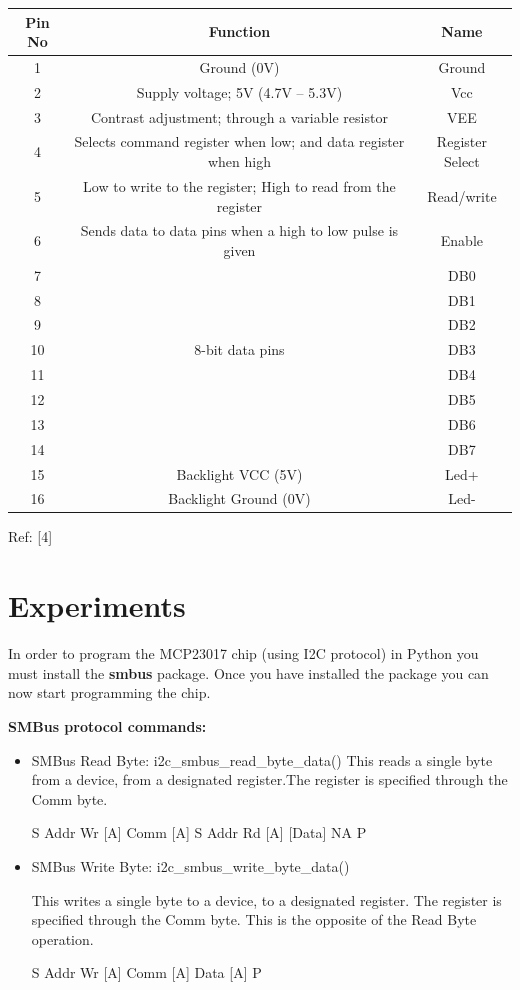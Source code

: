 \documentclass[11pt,a4paper]{article}
\begin{document}
	\begin{tabular}{|c|c|c|}
		\hline
		Pin No & Function & Name \\
		\hline
		1 & Ground (0V) & Ground \\
		\hline
		2 & Supply voltage; 5V (4.7V – 5.3V) & Vcc \\
		\hline
		3 & Contrast adjustment; through a variable resistor & VEE \\
		\hline
		4 & Selects command register when low; and data register when high & Register Select \\
		\hline
		5 & Low to write to the register; High to read from the register & Read/write \\
		\hline
		6 & Sends data to data pins when a high to low pulse is given & Enable \\
		\hline
		7 & & DB0 \\
		\hline
		8 & & DB1 \\
		\hline
        9 & & DB2 \\
        \hline
		10 & 8-bit data pins & DB3 \\
		\hline
		11 & & DB4 \\
		\hline
		12 & & DB5 \\
		\hline
		13 & & DB6 \\
		\hline
		14 & &DB7 \\
		\hline
		15 & Backlight VCC (5V) & Led+ \\
		\hline
		16 & Backlight Ground (0V) & Led- \\
		\hline
	\end{tabular}
	\flushleft
	Ref: [4]
	
	
	\newpage
	\section{Experiments}
	\flushleft
	In order to program the MCP23017 chip (using I2C protocol) in Python you must install the \textbf{smbus} package. Once you have installed the package you can now start programming the chip.
    
    \vspace{0.3cm}
    \textbf{SMBus protocol commands:}
    \begin{itemize}
    	\item SMBus Read Byte:  i2c\_smbus\_read\_byte\_data()
    	This reads a single byte from a device, from a designated register.The register is specified through the Comm byte.
    	
    	S Addr Wr [A] Comm [A] S Addr Rd [A] [Data] NA P
    	
        \item SMBus Write Byte:  i2c\_smbus\_write\_byte\_data()
        
        This writes a single byte to a device, to a designated register. The register is specified through the Comm byte. This is the opposite of the Read Byte operation.
        
        S Addr Wr [A] Comm [A] Data [A] P
    	
    \end{itemize}
    
\end{document}
